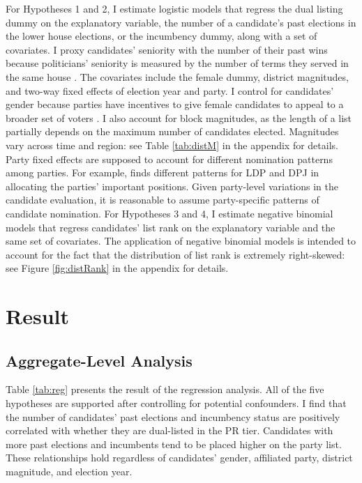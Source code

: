 \documentclass[a4paper, 11pt]{article}
\begin{document}
For Hypotheses 1 and 2, I estimate logistic models that regress the dual listing dummy on the explanatory variable, the number of a candidate's past elections in the lower house elections, or the incumbency dummy, along with a set of covariates. I proxy candidates' seniority with the number of their past wins because politicians' seniority is measured by the number of terms they served in the same house \citep{pekkanen2006electoral}. The covariates include the female dummy, district magnitudes, and two-way fixed effects of election year and party. I control for candidates' gender because parties have incentives to give female candidates to appeal to a broader set of voters \citep{salmond2006proportional, chiru2017value}. I also account for block magnitudes, as the length of a list partially depends on the maximum number of candidates elected. Magnitudes vary across time and region: see Table \ref{tab:distM} in the appendix for details. Party fixed effects are supposed to account for different nomination patterns among parties. For example, \citet{fujimura2012position} finds different patterns for LDP and DPJ in allocating the parties' important positions. Given party-level variations in the candidate evaluation, it is reasonable to assume party-specific patterns of candidate nomination. For Hypotheses 3 and 4, I estimate negative binomial models that regress candidates' list rank on the explanatory variable and the same set of covariates. The application of negative binomial models is intended to account for the fact that the distribution of list rank is extremely right-skewed: see Figure \ref{fig:distRank} in the appendix for details.

\section{Result} \label{sec: res}

\subsection{Aggregate-Level Analysis}

Table \ref{tab:reg} presents the result of the regression analysis. All of the five hypotheses are supported after controlling for potential confounders. I find that the number of candidates' past elections and incumbency status are positively correlated with whether they are dual-listed in the PR tier. Candidates with more past elections and incumbents tend to be placed higher on the party list. These relationships hold regardless of candidates' gender, affiliated party, district magnitude, and election year. 
\end{document}
